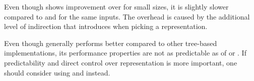 Even though \pvec{} shows improvement over \rrbvec{} for small sizes, it is slightly slower compared to \stdvec{} and \rrbvec{} for the same inputs. The overhead is caused by the additional level of indirection that \pvec{} introduces when picking a representation. 


Even though \pvec{} generally performs better compared to other tree-based implementations, its performance properties are not as predictable as of \stdvec{} or \rrbvec{}. If predictability and direct control over representation is more important, one should consider using \rrbvec{} and \stdvec{} instead. 

